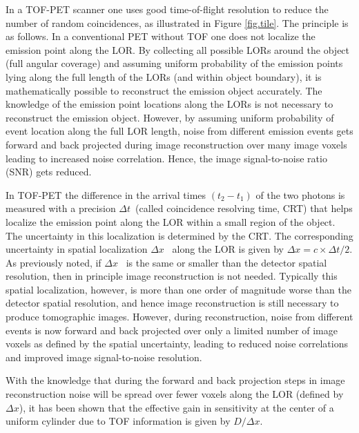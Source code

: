 \documentclass[review]{elsarticle}
\begin{document}
In a TOF-PET scanner one uses good time-of-flight resolution to reduce the number of random coincidences, as illustrated in Figure \ref{fig.tile}. The principle is as follows. In a conventional PET without TOF one does not localize the emission point along the LOR. By collecting all possible LORs around the object (full angular coverage) and assuming uniform probability of the emission points lying along the full length of the LORs (and within object boundary), it is mathematically possible to reconstruct the emission object accurately. The knowledge of the emission point locations along the LORs is not necessary to reconstruct the emission object. However, by assuming uniform probability of event location along the full LOR length, noise from different emission events gets forward and back projected during image reconstruction over many image voxels leading to increased noise correlation. Hence, the image signal-to-noise ratio (SNR) gets reduced.

In TOF-PET the difference in the arrival times $(t_2 - t_1)$ of the two photons is measured with a precision $\Delta t$~(called coincidence resolving time, CRT) that helps localize the emission point along the LOR within a small region of the object. The uncertainty in this localization is determined by the CRT. The corresponding uncertainty in spatial localization $\Delta x$~ along the LOR is given by 
$\Delta x=c \times \Delta t/2$. As previously noted, if $\Delta x$~ is the same or smaller than the detector spatial resolution, then in principle image reconstruction is not needed. Typically this spatial localization, however, is more than one order of magnitude worse than the detector spatial resolution, and hence image reconstruction is still necessary to produce tomographic images. However, during reconstruction, noise from different events is now forward and back projected over only a limited number of image voxels as defined by the spatial uncertainty, leading to reduced noise correlations and improved image signal-to-noise resolution.
%
%

With the knowledge that during the forward and back projection steps in image reconstruction noise will be spread over fewer voxels along the LOR (defined by $\Delta x$), it has been  shown  that the effective gain in sensitivity at the center of a uniform cylinder due to TOF information is given by $D/\Delta x$\cite{snyder, budinger}. 
\end{document}
